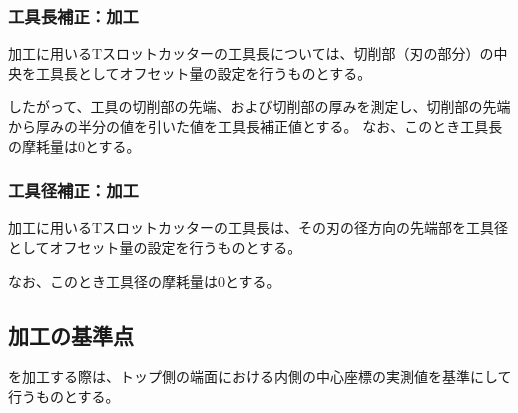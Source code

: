 \subsubsection{工具長補正：\dimple 加工}
\dimple 加工に用いるTスロットカッターの工具長については、切削部（刃の部分）の中央を工具長としてオフセット量の設定を行うものとする。

したがって、工具の切削部の先端、および切削部の厚みを測定し、切削部の先端から厚みの半分の値を引いた値を工具長補正値とする。
なお、このとき工具長の摩耗量は0とする。

\subsubsection{工具径補正：\dimple 加工}
\dimple 加工に用いるTスロットカッターの工具長は、その刃の径方向の先端部を工具径としてオフセット量の設定を行うものとする。

なお、このとき工具径の摩耗量は0とする。


\subsection{\dimple 加工の基準点}
\dimple を加工する際は、トップ側の端面における内側の中心座標の実測値を基準にして行うものとする。


